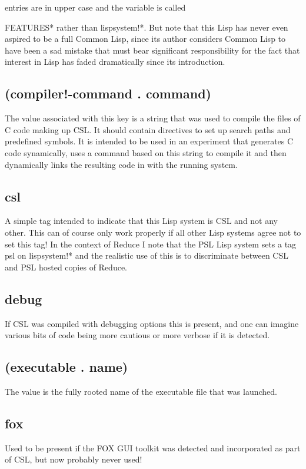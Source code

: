\documentclass[a4paper,11pt]{article}
\begin{document}
   entries are in upper case and the variable is called {\ttfamily *FEATURES*
   rather than {\ttfamily lispsystem!*}. But note that this Lisp has never even
   aspired to be a full Common Lisp, since its author considers Common Lisp to
   have been a sad mistake that must bear significant responsibility for the
   fact that interest in Lisp has faded dramatically since its introduction.
  

\subsection{\ttfamily (compiler!-command . command)}
   The value associated with this key is a string that was used to compile the
   files of C code making up CSL. It should contain directives to set up
   search paths and predefined symbols. It is intended to be used in an
   experiment that generates C code synamically, uses a command based on this
   string to compile it and then dynamically links the resulting code in with
   the running system.

\subsection{\ttfamily csl}
   A simple tag intended to indicate that this Lisp system is CSL and not any
   other. This can of course only work properly if all other Lisp systems
   agree not to set this tag! In the context of Reduce I note that the PSL
   Lisp system sets a tag {\ttfamily psl} on {\ttfamily lispsystem!*} and
   the realistic use of this is to discriminate between CSL and PSL hosted
   copies of Reduce.

\subsection{\ttfamily debug}
   If CSL was compiled with debugging options this is present, and one can imagine
   various bits of code being more cautious or more verbose if it is detected.

\subsection{\ttfamily (executable . name)}
   The value is the fully rooted name of the executable file that was launched.

\subsection{\ttfamily fox}
   Used to be present if the FOX GUI toolkit was detected and incorporated as
   part of CSL, but now probably never used!

}
\end{document}
